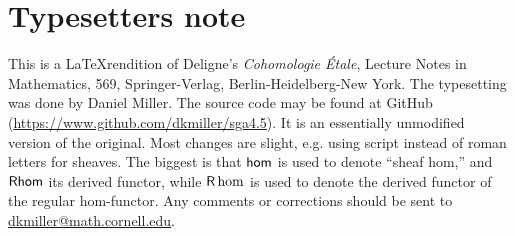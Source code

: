 
\section*{Typesetters note}

This is a \LaTeX rendition of Deligne's \emph{Cohomologie \'Etale}, Lecture 
Notes in Mathematics, 569, Springer-Verlag, Berlin-Heidelberg-New York. The 
typesetting was done by Daniel Miller. The source code may be found at 
GitHub (\url{https://www.github.com/dkmiller/sga4.5}). It is an essentially 
unmodified version of the original. Most changes are slight, e.g. using 
script instead of roman letters for sheaves. The biggest is that 
$\operatorname{\mathsf{hom}}$ is used to denote ``sheaf hom,'' and $\mathsf{Rhom}$ its derived functor, while 
$\mathsf{R}\hom$ is used to denote the derived functor of the regular hom-functor. Any 
comments or corrections should be sent to \url{dkmiller@math.cornell.edu}.